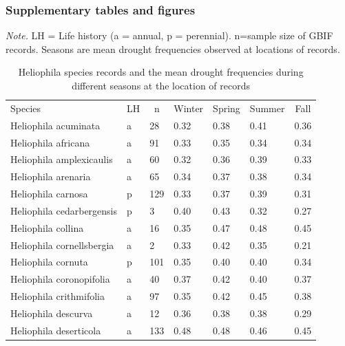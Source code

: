 \documentclass[man,floatsintext]{apa6}
\makeatletter
\newcommand\LastLTentrywidth{1em}
\newlength\longtablewidth
\newcommand{\getlongtablewidth}{\begingroup \ifcsname LT@\roman{LT@tables}\endcsname \global\longtablewidth=0pt \renewcommand{\LT@entry}[2]{\global\advance\longtablewidth by ##2\relax\gdef\LastLTentrywidth{##2}}\@nameuse{LT@\roman{LT@tables}} \fi \endgroup}
\theoremstyle{definition}
\theoremstyle{definition}
\theoremstyle{definition}
\theoremstyle{remark}
\makeatother
\begin{document}
\hypertarget{supplementary-tables-and-figures}{%
\subsubsection{Supplementary tables and
figures}\label{supplementary-tables-and-figures}}

\begin{center}
\begin{ThreePartTable}
\begin{TableNotes}[para]
\normalsize{\textit{Note.} LH = Life history (a = annual, p = perennial). n=sample size of GBIF records. Seasons are mean drought frequencies observed at locations of records.}
\end{TableNotes}
\small{
\begin{longtable}{lllllll}\noalign{\getlongtablewidth\global\LTcapwidth=\longtablewidth}
\caption{\label{tab:speciesmeanstable}Heliophila species records and the mean drought frequencies during different seasons at the location of records }\\
\toprule
Species & \multicolumn{1}{c}{LH} & \multicolumn{1}{c}{n} & \multicolumn{1}{c}{Winter} & \multicolumn{1}{c}{Spring} & \multicolumn{1}{c}{Summer} & \multicolumn{1}{c}{Fall}\\
\midrule
Heliophila acuminata & a & 28 & 0.32 & 0.38 & 0.41 & 0.36\\
Heliophila africana & a & 91 & 0.33 & 0.35 & 0.34 & 0.34\\
Heliophila amplexicaulis & a & 60 & 0.32 & 0.36 & 0.39 & 0.33\\
Heliophila arenaria & a & 65 & 0.34 & 0.37 & 0.38 & 0.34\\
Heliophila carnosa & p & 129 & 0.33 & 0.37 & 0.39 & 0.31\\
Heliophila cedarbergensis & p & 3 & 0.40 & 0.43 & 0.32 & 0.27\\
Heliophila collina & a & 16 & 0.35 & 0.47 & 0.48 & 0.45\\
Heliophila cornellsbergia & a & 2 & 0.33 & 0.42 & 0.35 & 0.21\\
Heliophila cornuta & p & 101 & 0.35 & 0.40 & 0.40 & 0.34\\
Heliophila coronopifolia & a & 40 & 0.37 & 0.42 & 0.40 & 0.37\\
Heliophila crithmifolia & a & 97 & 0.35 & 0.42 & 0.45 & 0.38\\
Heliophila descurva & a & 12 & 0.36 & 0.38 & 0.38 & 0.29\\
Heliophila deserticola & a & 133 & 0.48 & 0.48 & 0.46 & 0.45\\

\end{longtable}}
\end{ThreePartTable}
\end{center}
\end{document}
